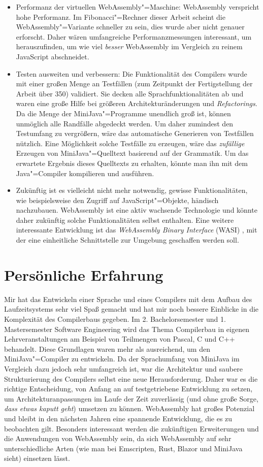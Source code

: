 \begin{itemize}
    \item Performanz der virtuellen WebAssembly"=Maschine: WebAssembly verspricht hohe Performanz. Im Fibonacci"=Rechner dieser Arbeit scheint die WebAssembly"=Variante schneller zu sein, dies wurde aber nicht genauer erforscht. Daher wären umfangreiche Performanzmessungen interessant, um herauszufinden, um wie viel \emph{besser} WebAssembly im Vergleich zu reinem JavaScript abschneidet.
    \item Testen ausweiten und verbessern: Die Funktionalität des Compilers wurde mit einer großen Menge an Testfällen (zum Zeitpunkt der Fertigstellung der Arbeit über 350) validiert. Sie decken alle Sprachfunktionalitäten ab und waren eine große Hilfe bei größeren Architekturänderungen und \emph{Refactorings}. Da die Menge der MiniJava"=Programme unendlich groß ist, können unmöglich alle Randfälle abgedeckt werden. Um daher zumindest den Testumfang zu vergrößern, wäre das automatische Generieren von Testfällen nützlich. Eine Möglichkeit solche Testfälle zu erzeugen, wäre das \emph{zufällige} Erzeugen von MiniJava"=Quelltext basierend auf der Grammatik. Um das erwartete Ergebnis dieses Quelltexts zu erhalten, könnte man ihn mit dem Java"=Compiler kompilieren und ausführen.
    \item Zukünftig ist es vielleicht nicht mehr notwendig, gewisse Funktionalitäten, wie beispielsweise den Zugriff auf JavaScript"=Objekte, händisch nachzubauen. WebAssembly ist eine aktiv wachsende Technologie und könnte daher zukünftig solche Funktionalitäten selbst enthalten. Eine weitere interessante Entwicklung ist das \emph{WebAssembly Binary Interface} (WASI) \cite{WASI}, mit der eine einheitliche Schnittstelle zur Umgebung geschaffen werden soll.
\end{itemize}

\section{Persönliche Erfahrung}

Mir hat das Entwickeln einer Sprache und eines Compilers mit dem Aufbau des Laufzeitsystems sehr viel Spaß gemacht und hat mir noch bessere Einblicke in die Komplexität des Compilerbaus gegeben. Im 2. Bachelorsemester und 1. Mastersemester Software Engineering wird das Thema Compilerbau in eigenen Lehrveranstaltungen am Beispiel von Teilmengen von Pascal, C und C++ behandelt. Diese Grundlagen waren mehr als ausreichend, um den MiniJava"=Compiler zu entwickeln. Da der Sprachumfang von MiniJava im Vergleich dazu jedoch sehr umfangreich ist, war die Architektur und saubere Strukturierung des Compilers selbst eine neue Herausforderung. Daher war es die richtige Entscheidung, von Anfang an auf testgetriebene Entwicklung zu setzen, um Architekturanpassungen im Laufe der Zeit zuverlässig (und ohne große Sorge, \emph{dass etwas kaputt geht}) umsetzen zu können. WebAssembly hat großes Potenzial und bleibt in den nächsten Jahren eine spannende Entwicklung, die es zu beobachten gilt. Besonders interessant werden die zukünftigen Erweiterungen und die Anwendungen von WebAssembly sein, da sich WebAssembly auf sehr unterschiedliche Arten (wie man bei Emscripten, Rust, Blazor und MiniJava sieht) einsetzen lässt.

